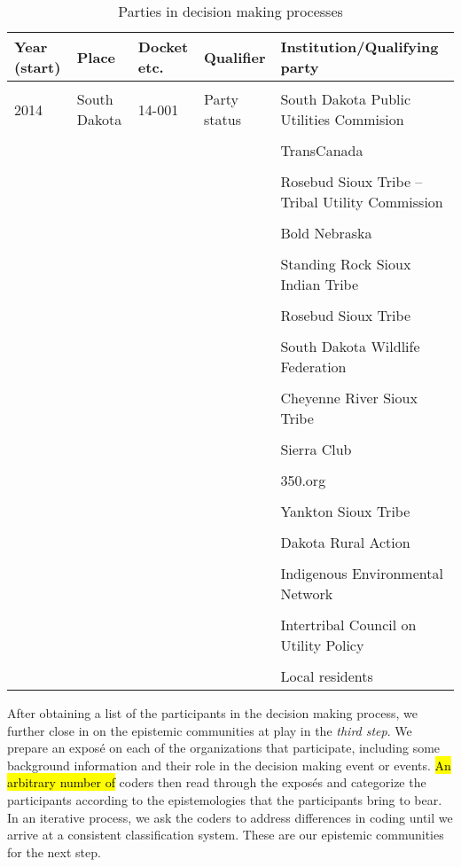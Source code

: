 \documentclass{article}
\newcommand{\f}{&&&&}
\begin{document}
	\begin{table}
	\caption{Parties in decision making processes}
	\label{tab:SD}
	\begin{tabularx}{\textwidth}{s s s s X}
		Year (start)	
		& Place 		
		& Docket etc. 
		& Qualifier 
		& Institution/Qualifying party\\ 
		\toprule\\

		2014 
		& South Dakota 
		& 14-001 
		& Party status 
		& South Dakota Public Utilities Commision\\\\

		\f TransCanada\\\\
		\f Rosebud Sioux Tribe -- Tribal Utility Commission\\\\
		\f Bold Nebraska\\\\
		\f Standing Rock Sioux Indian Tribe\\\\
		\f Rosebud Sioux Tribe\\\\
		\f South Dakota Wildlife Federation\\\\
		\f Cheyenne River Sioux Tribe\\\\
		\f Sierra Club\\\\
		\f 350.org\\\\
		\f Yankton Sioux Tribe\\\\
		\f Dakota Rural Action\\\\
		\f Indigenous Environmental Network\\\\
		\f Intertribal Council on Utility Policy\\\\
		\f Local residents
	\end{tabularx}
	\parnotes
	\end{table}

	After obtaining a list of the participants in the decision making process, we further close in on the epistemic communities at play in the \textit{third step}. We prepare an exposé on each of the organizations that participate, including some background information and their role in the decision making event or events. \hl{An arbitrary number of } coders then read through the exposés and categorize the participants according to the epistemologies that the participants bring to bear. In an iterative process, we ask the coders to address differences in coding until we arrive at a consistent classification system. These are our epistemic communities for the next step.
\end{document}

